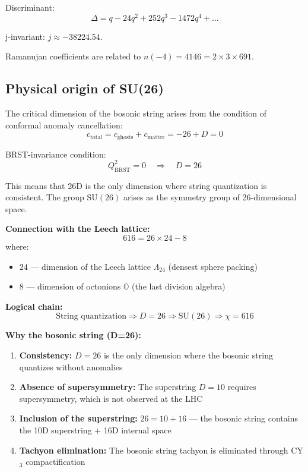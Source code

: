 \documentclass[12pt,a4paper,twoside]{article}
\newcommand{\SU}{\mathrm{SU}}
\theoremstyle{definition}
\begin{document}
Discriminant:
\begin{equation}
\Delta = q - 24q^2 + 252q^3 - 1472q^4 + \ldots
\label{eq:discriminant}
\end{equation}

j-invariant: $j \approx -38224.54$.

Ramanujan coefficients are related to $n(-4) = 4146 = 2 \times 3 \times 691$.

\subsection{Physical origin of SU(26)}
\label{sec:origin_su26}

The critical dimension of the bosonic string arises from the condition of conformal anomaly cancellation:
\begin{equation}
c_{\text{total}} = c_{\text{ghosts}} + c_{\text{matter}} = -26 + D = 0
\label{eq:critical_dim}
\end{equation}

BRST-invariance condition:
\begin{equation}
Q_{\text{BRST}}^2 = 0 \quad \Rightarrow \quad D = 26
\label{eq:brst}
\end{equation}

This means that 26D is the only dimension where string quantization is consistent. The group $\SU(26)$ arises as the symmetry group of 26-dimensional space.

\textbf{Connection with the Leech lattice:}
\begin{equation}
616 = 26 \times 24 - 8
\label{eq:leech}
\end{equation}
where:
\begin{itemize}
    \item $24$ — dimension of the Leech lattice $\Lambda_{24}$ (densest sphere packing)
    \item $8$ — dimension of octonions $\mathbb{O}$ (the last division algebra)
\end{itemize}

\textbf{Logical chain:}
\begin{equation}
\boxed{
\text{String quantization} \Rightarrow D=26 \Rightarrow \SU(26) \Rightarrow \chi=616
}
\end{equation}

\textbf{Why the bosonic string (D=26):}
\begin{enumerate}
    \item \textbf{Consistency:} $D=26$ is the only dimension where the bosonic string quantizes without anomalies
    \item \textbf{Absence of supersymmetry:} The superstring $D=10$ requires supersymmetry, which is not observed at the LHC
    \item \textbf{Inclusion of the superstring:} $26 = 10 + 16$ — the bosonic string contains the 10D superstring + 16D internal space
    \item \textbf{Tachyon elimination:} The bosonic string tachyon is eliminated through CY$_3$ compactification
\end{enumerate}
\end{document}
